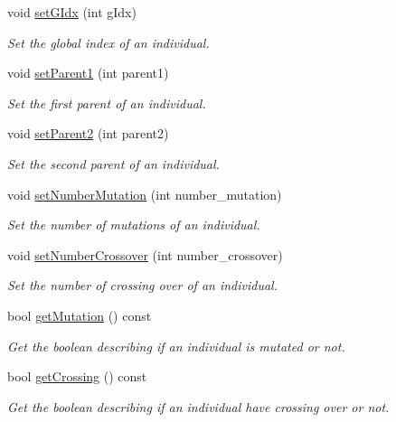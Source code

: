\begin{DoxyCompactItemize}
void \hyperlink{class_individu_a1b3a6c4e4387dc538867d0e353601545}{set\+G\+Idx} (int g\+Idx)
\begin{DoxyCompactList}\small\item\em Set the global index of an individual. \end{DoxyCompactList}\item 
void \hyperlink{class_individu_a46912d0d2b00a414a37a6091cae891c6}{set\+Parent1} (int parent1)
\begin{DoxyCompactList}\small\item\em Set the first parent of an individual. \end{DoxyCompactList}\item 
void \hyperlink{class_individu_a134f7718457e3881bf3d60bfd5b05c08}{set\+Parent2} (int parent2)
\begin{DoxyCompactList}\small\item\em Set the second parent of an individual. \end{DoxyCompactList}\item 
void \hyperlink{class_individu_a2daaf6fb00bfe902d31bd30558ec6567}{set\+Number\+Mutation} (int number\+\_\+mutation)
\begin{DoxyCompactList}\small\item\em Set the number of mutations of an individual. \end{DoxyCompactList}\item 
void \hyperlink{class_individu_acb83b642ec6c87abd2ca43c7479d79cf}{set\+Number\+Crossover} (int number\+\_\+crossover)
\begin{DoxyCompactList}\small\item\em Set the number of crossing over of an individual. \end{DoxyCompactList}\item 
bool \hyperlink{class_individu_afa42bb4d0c582475f4f4a0c506e7bc15}{get\+Mutation} () const
\begin{DoxyCompactList}\small\item\em Get the boolean describing if an individual is mutated or not. \end{DoxyCompactList}\item 
bool \hyperlink{class_individu_ad607487c88c83891aea94679030a1998}{get\+Crossing} () const
\begin{DoxyCompactList}\small\item\em Get the boolean describing if an individual have crossing over or not. \end{DoxyCompactList}\item 

\end{DoxyCompactItemize}
